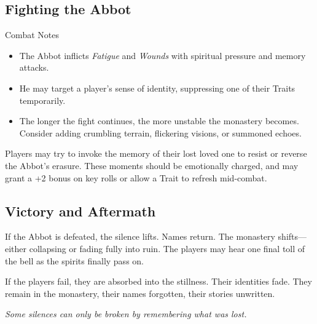 \documentclass[nodeprecatedcode,bg=print]{dndbook/dndbook}
\begin{document}
\subsection{Fighting the Abbot}

\begin{WyrdComment}{Combat Notes}
    \begin{itemize}
        \item The Abbot inflicts \emph{Fatigue} and \emph{Wounds} with spiritual pressure and memory attacks.
        \item He may target a player’s sense of identity, suppressing one of their Traits temporarily.
        \item The longer the fight continues, the more unstable the monastery becomes. Consider adding crumbling terrain, flickering visions, or summoned echoes.
    \end{itemize}
\end{WyrdComment}

Players may try to invoke the memory of their lost loved one to resist or reverse the Abbot’s erasure. These moments should be emotionally charged, and may grant a +2 bonus on key rolls or allow a Trait to refresh mid-combat.

\subsection{Victory and Aftermath}

If the Abbot is defeated, the silence lifts. Names return. The monastery shifts—either collapsing or fading fully into ruin. The players may hear one final toll of the bell as the spirits finally pass on.

If the players fail, they are absorbed into the stillness. Their identities fade. They remain in the monastery, their names forgotten, their stories unwritten.

\emph{Some silences can only be broken by remembering what was lost.}
\end{document}
